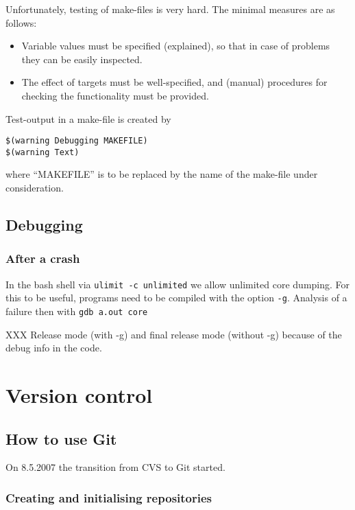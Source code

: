 \documentclass{book}
\begin{document}
Unfortunately, testing of make-files is very hard. The minimal measures are as follows:
\begin{itemize}
\item Variable values must be specified (explained), so that in case of problems they can be easily inspected.
\item The effect of targets must be well-specified, and (manual) procedures for checking the functionality must be provided.
\end{itemize}

Test-output in a make-file is created by
\begin{verbatim}
$(warning Debugging MAKEFILE)
$(warning Text)
\end{verbatim}
where ``MAKEFILE'' is to be replaced by the name of the make-file under consideration.






\chapter{Debugging}
\label{cha:debug}


\section{After a crash}
\label{sec:debugafter}

In the bash shell via \texttt{ulimit -c unlimited} we allow unlimited core dumping. For this to be useful, programs need to be compiled with the option \texttt{-g}. Analysis of a failure then with
\texttt{gdb a.out core}

XXX Release mode (with -g) and final release mode (without -g) because of the debug info in the code.






\part{Version control}
\label{par:Versioncontrol}



\chapter{How to use Git}
\label{cha:HowGit}


On 8.5.2007 the transition from CVS to Git started.

\section{Creating and initialising repositories}
\label{sec:GitInit}
\end{document}
